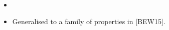 \documentclass[preview]{standalone}
\begin{document}
\begin{center}
\begin{itemize} \item \item Generalised to a family of properties in [BEW15].\end{itemize}
\end{center}
\end{document}
